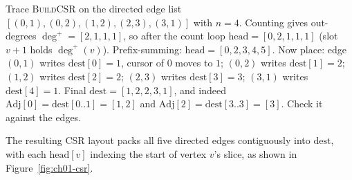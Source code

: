 \begin{labbox}
Trace \textsc{BuildCSR} on the directed edge list
$[(0,1),(0,2),(1,2),(2,3),(3,1)]$ with $n=4$. Counting gives out-degrees
$\deg^+ = [2,1,1,1]$, so after the count loop
$\mathrm{head} = [0,2,1,1,1]$ (slot $v{+}1$ holds $\deg^+(v)$). Prefix-summing:
$\mathrm{head} = [0,2,3,4,5]$. Now place: edge $(0,1)$ writes $\mathrm{dest}[0]{=}1$,
cursor of $0$ moves to $1$; $(0,2)$ writes $\mathrm{dest}[1]{=}2$; $(1,2)$ writes
$\mathrm{dest}[2]{=}2$; $(2,3)$ writes $\mathrm{dest}[3]{=}3$; $(3,1)$ writes
$\mathrm{dest}[4]{=}1$. Final $\mathrm{dest} = [1,2,2,3,1]$, and indeed
$\mathrm{Adj}[0]=\mathrm{dest}[0..1]=[1,2]$ and $\mathrm{Adj}[2]=\mathrm{dest}[3..3]=[3]$.
Check it against the edges.
\end{labbox}

The resulting CSR layout packs all five directed edges contiguously into
$\mathrm{dest}$, with each $\mathrm{head}[v]$ indexing the start of vertex $v$'s
slice, as shown in Figure~\ref{fig:ch01-csr}.


